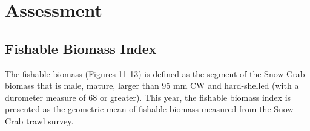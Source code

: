 \documentclass[paper=a4, fontsize=11pt]{article}
\begin{document}



\section{Assessment}

\subsection{Fishable Biomass Index}
The fishable biomass (Figures 11-13) is defined as the segment of the Snow Crab biomass that is male, mature, larger than 95 mm CW and hard-shelled (with a durometer measure of 68 or greater). This year, the fishable biomass index is presented as the geometric mean of fishable biomass measured from the Snow Crab trawl survey.\\
\end{document}
